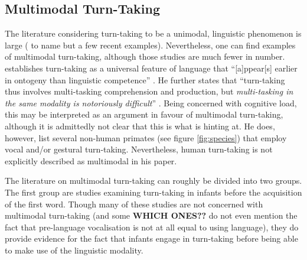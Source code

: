 \subsection{Multimodal Turn-Taking}
\label{sec:introductionresearchturntaking}
The literature considering turn-taking to be a unimodal, linguistic phenomenon is large (\citet{casillas_turn-taking_2016,freud_turn-taking_2016,heldner_pauses_2010} to name but a few recent examples).
Nevertheless, one can find examples of multimodal turn-taking, although those studies are much fewer in number.
\citet{levinson_turn-taking_2016} establishes turn-taking as a universal feature of language that ``[a]ppear[s] earlier in ontogeny than linguistic competence'' \citep[]{levinson_turn-taking_2016}.
He further states that ``turn-taking thus involves multi-tasking comprehension and production, but \emph{multi-tasking in the same modality is notoriously difficult}'' \citep[, emphasis mine]{levinson_turn-taking_2016}.
Being concerned with cognitive load, this may be interpreted as an argument in favour of multimodal turn-taking, although it is admittedly not clear that this is what \citeauthor{levinson_turn-taking_2016} is hinting at.
He does, however, list several non-human primates (see figure \ref{fig:species}) that employ vocal and/or gestural turn-taking.
Nevertheless, human turn-taking is not explicitly described as multimodal in his paper.

The literature on multimodal turn-taking can roughly be divided into two groups.
The first group are studies examining turn-taking in infants before the acquisition of the first word.
Though many of these studies are not concerned with multimodal turn-taking (and some \textbf{WHICH ONES??} do not even mention the fact that pre-language vocalisation is not at all equal to using language), they do provide evidence for the fact that infants engage in turn-taking before being able to make use of the linguistic modality.

